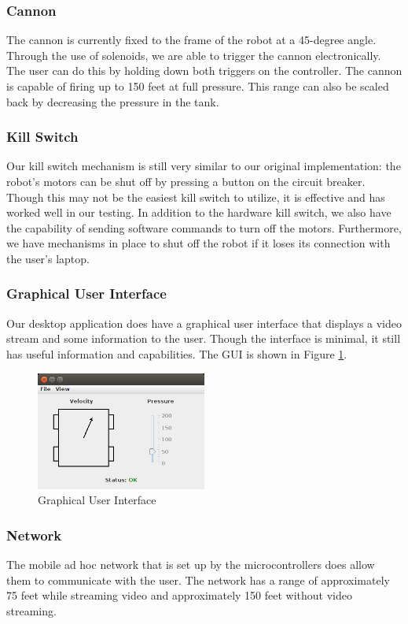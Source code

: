\documentclass[letterpaper,12pt]{article}
\begin{document}
\subsubsection{Cannon}
The cannon is currently fixed to the frame of the robot at a 45-degree
angle. Through the use of solenoids, we are able to trigger the cannon
electronically. The user can do this by holding down both triggers on the
controller. The cannon is capable of firing up to 150 feet at full
pressure. This range can also be scaled back by decreasing the pressure in the
tank.

\subsubsection{Kill Switch}
Our kill switch mechanism is still very similar to our original implementation:
the robot's motors can be shut off by pressing a button on the circuit
breaker. Though this may not be the easiest kill switch to utilize, it is
effective and has worked well in our testing. In addition to the hardware kill
switch, we also have the capability of sending software commands to turn off the
motors. Furthermore, we have mechanisms in place to shut off the robot if it
loses its connection with the user's laptop.

\subsubsection{Graphical User Interface}
Our desktop application does have a graphical user interface that displays a
video stream and some information to the user. Though the interface is minimal,
it still has useful information and capabilities. The GUI is shown in Figure
\ref{fig:gui}.

\begin{figure}[h!]
  \centering
  \includegraphics[width=0.5\textwidth]{pics/gui.png}
  \caption{Graphical User Interface}
  \label{fig:gui}
\end{figure}

\subsubsection{Network}
The mobile ad hoc network that is set up by the microcontrollers does allow them
to communicate with the user. The network has a range of approximately 75 feet
while streaming video and approximately 150 feet without video streaming.
\end{document}
